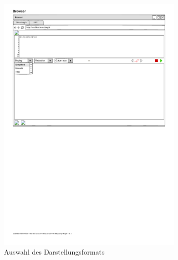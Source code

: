 \documentclass[parskip=full,11pt,twoside]{scrartcl}
\begin{document}
\begin{figure}[H]
	\begin{subfigure}[l]{0.25\textwidth}
	\centering
		\includegraphics{img/displayMenu}
	\caption{Auswahl des Darstellungsformats}	
	\end{subfigure}
	\hspace*{\fill}
	\begin{subfigure}[m]{0.25\textwidth}
	\centering

\end{subfigure}
\end{figure}
\end{document}
